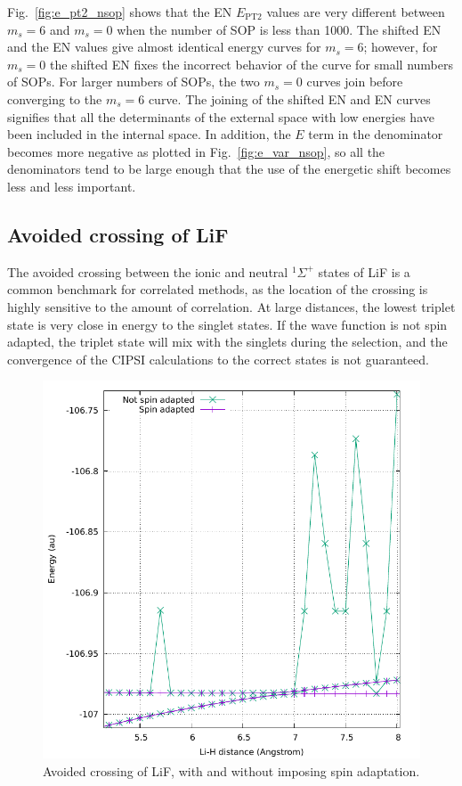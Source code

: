 \documentclass[aip,jcp,reprint,showkeys]{revtex4-1}
\newcommand{\sop}{SOP}
\newcommand{\cipsi}{CIPSI}
\newcommand{\ept}{E_\text{PT2}}
\begin{document}
Fig.~\ref{fig:e_pt2_nsop} shows that the EN $\ept$ values are very different
between $m_s=6$ and $m_s=0$ when the number of {\sop} is less than 1000. The
shifted EN and the EN values give almost identical energy curves for $m_s=6$;
however, for $m_s=0$ the shifted EN fixes the incorrect behavior of the curve
for small numbers of {\sop s}. For larger numbers of {\sop s}, the two $m_s=0$
curves join before converging to the $m_s=6$ curve. The joining of the shifted
EN and EN curves signifies that all the determinants of the external space with
low energies have been included in the internal space. In addition, the $E$
term in the denominator becomes more negative as plotted in
Fig.~\ref{fig:e_var_nsop}, so all the denominators tend to be large enough that
the use of the energetic shift becomes less and less important.


\subsection{Avoided crossing of LiF}

The avoided crossing between the ionic and neutral $^1\Sigma^+$ states of LiF is a 
common benchmark for correlated methods, as the location of the crossing is highly
sensitive to the amount of correlation. At large distances, the lowest triplet state
is very close in energy to the singlet states. If the wave function is not
spin adapted, the triplet state will mix with the singlets during the selection,
and the convergence of the {\cipsi} calculations to the correct states is not guaranteed.

\begin{figure}
\includegraphics[width=0.9\columnwidth]{lif}
\caption{Avoided crossing of LiF, with and without imposing spin adaptation.}
\label{fig:lif}
\end{figure}
\end{document}
